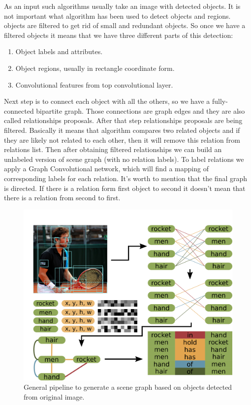 As an input such algorithms usually take an image with detected objects. It is not important what algorithm has been used to detect objects and regions. objects are filtered to get rid of small and redundant objects. So once we have a filtered objects it means that we have three different parts of this detection:

\begin{enumerate}
    \item Object labels and attributes.
    \item Object regions, usually in rectangle coordinate form.
    \item Convolutional features from top convolutional layer.
\end{enumerate}

Next step is to connect each object with all the others, so we have a fully-connected bipartite graph. Those connections are graph edges and they are also called relationships proposals. After that step relationships proposals are being filtered. Basically it means that algorithm compares two related objects and if they are likely not related to each other, then it will remove this relation from relations list. Then after obtaining filtered relationships we can build an unlabeled version of scene graph (with no relation labels). To label relations we apply a Graph Convolutional network, which will find a mapping of corresponding labels for each relation. It's worth to mention that the final graph is directed. If there is a relation form first object to second it doesn't mean that there is a relation from second to first.

\begin{figure}[!h]
    \centering
    \includegraphics[width=\textwidth]{figure/sgg-pipeline.png}
    \caption{General pipeline to generate a scene graph based on objects detected from original image.}
    \label{sgg-pipeline}
\end{figure}


